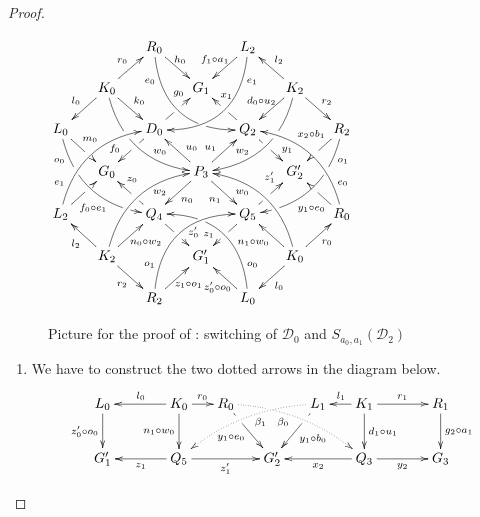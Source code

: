\documentclass[a4paper,UKenglish,cleveref,pdftex,thm-restate,numberwithinsect,anonymous]{lipics}
\def\G{\textbf {\textup{G}}}
\newcommand{\dder}[1]{\mathscr{#1}}
\begin{document}
\begin{proof}
	
	\begin{figure}
		\centering
		$\xymatrix@C=15pt@R=15pt{&&R_0 \ar@/_.8cm/[ddrr]_(.2){e_0}|(.7)\hole
			\ar[dr]^{\hspace{-5pt}h_0}&& L_2\ar@/^.8cm/[ddll]^(.2){e_1}
			\ar[dl]_{f_1\circ a_1\hspace{-5pt}}\\&K_0\ar[dr]^{k_0}\ar[dl]_{l_0}
			\ar@/_.6cm/[ddrr]|(.36)\hole^(.65){w_0}\ar[ur]^{r_0}&& G_1 &&
			K_2 \ar@/^.6cm/[ddll]|(.36)\hole_(.65){w_2}\ar[dl]_{d_0\circ
				u_2\hspace{-5pt}}\ar[lu]_{l_2} \ar[dr]^{r_2}\\L_0
			\ar@/_.6cm/[ddrr]_(.2){o_0}|(.31)\hole|(.81)\hole
			\ar[dr]^(.4){m_0}|(.61)\hole && D_0
			\ar[dl]|(.4)\hole_(.65){f_0}\ar[ur]|(.5)\hole^(.7){g_0}&&Q_2
			\ar[dr]|(.4)\hole^(.65){y_1}
			\ar[ul]|(.5)\hole_(.65){x_1}&&R_2\ar@/^.6cm/[ddll]^(.2){o_1}|(.31)\hole|(.81)\hole\ar[dl]_(.3){x_2\circ
				b_1}|(.58)\hole \\&G_0 &&P_3\ar[dr]_{n_1}
			\ar[dl]^{n_0}\ar[ur]^(.4){u_1}\ar[ul]_(.4){u_0}&&G'_2\\L_2
			\ar@/^.6cm/[uurr]^(.2){e_1} \ar[ur]_(.35){f_0\circ
				e_1}|(.61)\hole&&Q_4
			\ar[ul]|(.4)\hole_(.65){z_0}\ar[dr]|(.5)\hole^(.65){z'_0}
			&&Q_5\ar[ur]|(.4)\hole^(.65){z'_1}
			\ar[dl]|(.5)\hole_(.65){z_1} && R_0 \ar[ul]^(.3){y_1\circ
				e_0}|(.6)\hole\ar@/_.6cm/[uull]_(.2){e_0}\\&K_2
			\ar[ur]_{\hspace{-2pt}n_0\circ w_2} \ar[dr]_{r_2}
			\ar[ul]^{l_2}\ar@/^.6cm/[uurr]_(.65){w_2}&&G'_1&& K_0
			\ar[ur]_{r_0} \ar[ul]^{n_1\circ w_0} \ar[dl]^{l_0}
			\ar@/_.6cm/[uull]^(.65){w_0}\\&& R_2
			\ar[ur]_{\hspace{-4pt}z_1\circ
				o_1}\ar@/^.8cm/[uurr]^(.2){o_1}&& L_0 \ar[ul]^{z'_0\circ
				o_0\hspace{-7pt}} \ar@/_.8cm/[uull]_(.2){o_0} |(.69)\hole
		}	$
		\caption{Picture for the proof of : switching of $\dder{D}_0$ and $S_{a_0,a_1}(\dder{D}_2)$}
		\label{fi:third}
	\end{figure}
	
	\begin{enumerate}
		\item We have to construct the two dotted arrows in the diagram
		below.
		\[\xymatrix@C=15pt{L_0 \ar[d]_{z'_0\circ o_0}&& K_0
			\ar[d]_{n_1\circ w_0}\ar[ll]_{l_0} \ar[r]^{r_0} & R_0
			\ar@{.>}@/^.35cm/[drrr]_(.4){\beta_0}|(.285)\hole
			\ar[dr]|(.28)\hole_{y_1\circ e_0} && L_1
			\ar@{.>}@/_.35cm/[dlll]^(.4){\beta_1}
			\ar[dl]|(.28)\hole^{y_1\circ b_0}& K_1 \ar[d]^{d_1\circ
				u_1}\ar[l]_{l_1} \ar[rr]^{r_1} && R_1 \ar[d]^{g_2\circ
				a_1}\\G'_1 && \ar[ll]^{z_1} Q_5 \ar[rr]_{z'_1}&& G'_2 &&
			\ar[ll]^{x_2} Q_3 \ar[rr]_{y_2}&& G_3}\]
		

\end{enumerate}
\end{proof}
\end{document}
